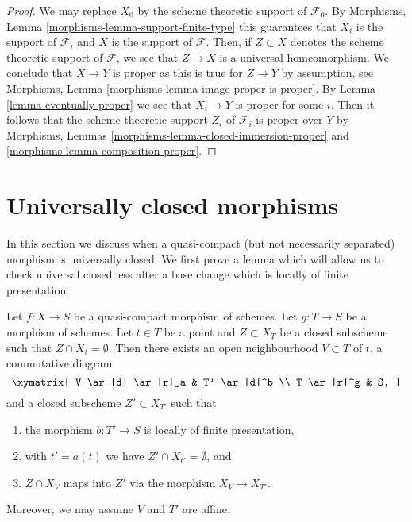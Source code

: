 \begin{proof}
We may replace $X_0$ by the scheme theoretic support of $\mathcal{F}_0$.
By Morphisms, Lemma \ref{morphisms-lemma-support-finite-type} this
guarantees that $X_i$ is the support of $\mathcal{F}_i$ and $X$ is the
support of $\mathcal{F}$. Then, if $Z \subset X$ denotes the scheme
theoretic support of $\mathcal{F}$, we see that $Z \to X$ is a universal
homeomorphism. We conclude that $X \to Y$ is proper as this is true for
$Z \to Y$ by assumption, see
Morphisms, Lemma \ref{morphisms-lemma-image-proper-is-proper}.
By Lemma \ref{lemma-eventually-proper} we see that $X_i \to Y$ is proper
for some $i$. Then it follows that the scheme theoretic support $Z_i$ of
$\mathcal{F}_i$ is proper over $Y$ by
Morphisms, Lemmas \ref{morphisms-lemma-closed-immersion-proper} and
\ref{morphisms-lemma-composition-proper}.
\end{proof}











\section{Universally closed morphisms}
\label{section-universally-closed}

\noindent
In this section we discuss when a quasi-compact (but not necessarily
separated) morphism is universally closed. We first prove a lemma which
will allow us to check universal closedness after a base change
which is locally of finite presentation.

\begin{lemma}
\label{lemma-separate}
Let $f : X \to S$ be a quasi-compact morphism of schemes.
Let $g : T \to S$ be a morphism of schemes.
Let $t \in T$ be a point and $Z \subset X_T$ be a closed
subscheme such that $Z \cap X_t = \emptyset$.
Then there exists an open neighbourhood
$V \subset T$ of $t$, a commutative diagram
$$
\xymatrix{
V \ar[d] \ar[r]_a & T' \ar[d]^b \\
T \ar[r]^g & S,
}
$$
and a closed subscheme $Z' \subset X_{T'}$ such that
\begin{enumerate}
\item the morphism $b : T' \to S$ is locally of finite presentation,
\item with $t' = a(t)$ we have $Z' \cap X_{t'} = \emptyset$, and
\item $Z \cap X_V$ maps into $Z'$ via the morphism $X_V \to X_{T'}$.
\end{enumerate}
Moreover, we may assume $V$ and $T'$ are affine.
\end{lemma}

